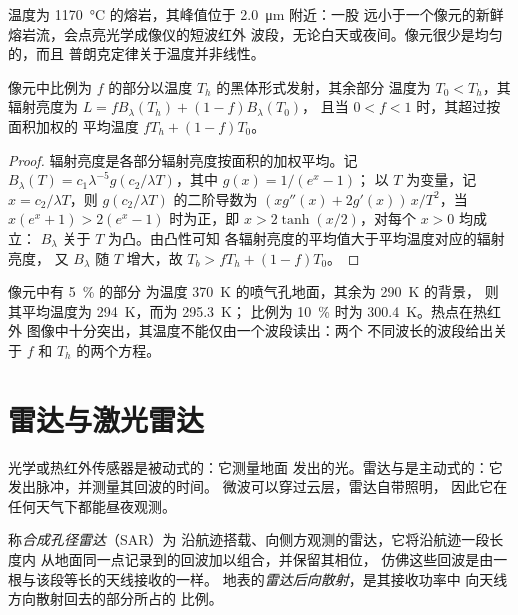 温度为 \qty{1170}{\celsius} 的熔岩，其峰值位于 \qty{2.0}{\micro\metre} 附近：一股
远小于一个像元的新鲜熔岩流，会点亮光学成像仪的短波红外
波段，无论白天或夜间。像元很少是均匀的，而且
普朗克定律关于温度并非线性。

\begin{proposition}[混合像元]\label{prop:b3:remote-sensing-gis:mixed}
像元中比例为 $f$ 的部分以温度 $T_h$ 的黑体形式发射，其余部分
温度为 $T_0 < T_h$，其辐射亮度为 $L = fB_\lambda(T_h) + (1 - f)B_\lambda(T_0)$，
且当 $0 < f < 1$ 时，其超过按面积加权的
平均温度 $fT_h + (1 - f)T_0$。
\end{proposition}

\begin{proof}
辐射亮度是各部分辐射亮度按面积的加权平均。记 $B_\lambda(T)
= c_1\lambda^{-5}g(c_2/\lambda T)$，其中 $g(x) = 1/(e^x - 1)$；
以 $T$ 为变量，记 $x = c_2/\lambda T$，则
$g(c_2/\lambda T)$ 的二阶导数为 $(x g''(x) + 2g'(x))\,x/T^2$，当 $x(e^x + 1)
> 2(e^x - 1)$ 时为正，即 $x > 2\tanh(x/2)$，对每个 $x > 0$ 均成立：
$B_\lambda$ 关于 $T$ 为凸。由凸性可知
各辐射亮度的平均值大于平均温度对应的辐射亮度，
又 $B_\lambda$ 随 $T$ 增大，故 $T_b > fT_h + (1 - f)T_0$。
\end{proof}

像元中有 \qty{5}{\percent} 的部分
为温度 \qty{370}{K} 的喷气孔地面，其余为 \qty{290}{K} 的背景，
则其平均温度为 \qty{294}{K}，而为 \qty{295.3}{K}；
比例为 \qty{10}{\percent} 时为 \qty{300.4}{K}。热点在热红外
图像中十分突出，其温度不能仅由一个波段读出：两个
不同波长的波段给出关于 $f$ 和 $T_h$ 的两个方程。

\section{雷达与激光雷达}\label{sec:b3:remote-sensing-gis:radar}

光学或热红外传感器是被动式的：它测量地面
发出的光。雷达与是主动式的：它发出脉冲，并测量其回波的时间。
微波可以穿过云层，雷达自带照明，
因此它在任何天气下都能昼夜观测。

\begin{definition}\label{def:b3:remote-sensing-gis:sar}
称\emph{合成孔径雷达}（SAR）为
沿航迹搭载、向侧方观测的雷达，它将沿航迹一段长度内
从地面同一点记录到的回波加以组合，并保留其相位，
仿佛这些回波是由一根与该段等长的天线接收的一样。
地表的\emph{雷达后向散射}，是其接收功率中
向天线方向散射回去的部分所占的
比例。
\end{definition}

